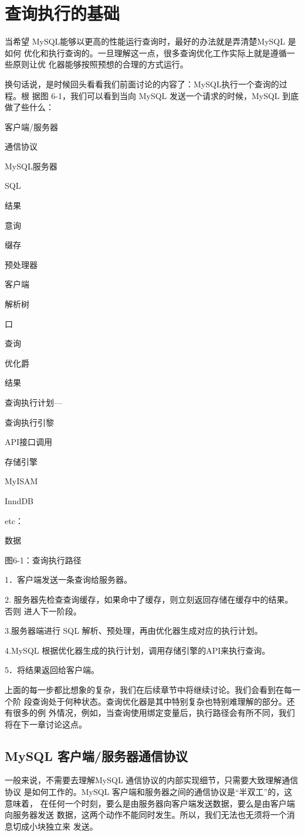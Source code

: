 \section{查询执行的基础}
当希望 MySQL能够以更高的性能运行查询时，最好的办法就是弄清楚MySQL 是如何
优化和执行查询的。一旦理解这一点，很多查询优化工作实际上就是遵循一些原则让优
化器能够按照预想的合理的方式运行。

换句话说，是时候回头看看我们前面讨论的内容了：MySQL执行一个查询的过程。根
据图 6-1，我们可以看到当向 MySQL 发送一个请求的时候，MySQL 到底做了些什么：

客户端/服务器

通信协议

MySQL服务器

SQL

结果

意询

缀存

预处理器

客户端

解析树

口

查询

优化爵

结果

查询执行计划—

查询执行引黎

API接口调用

存储引擎

MyISAM

InndDB

etc：

数据

图6-1：查询执行路径

1．客户端发送一条查询给服务器。

2. 服务器先检查查询缓存，如果命中了缓存，则立刻返回存储在缓存中的结果。否则
进人下一阶段。

3.服务器端进行 SQL 解析、预处理，再由优化器生成对应的执行计划。

4.MySQL 根据优化器生成的执行计划，调用存储引擎的API来执行查询。

5．将结果返回给客户端。

上面的每一步都比想象的复杂，我们在后续章节中将继续讨论。我们会看到在每一个阶
段查询处于何种状态。查询优化器是其中特别复杂也特别难理解的部分。还有很多的例
外情况，例如，当查询使用绑定变量后，执行路径会有所不同，我们将在下一章讨论这点。
\subsection{MySQL 客户端/服务器通信协议}
一般来说，不需要去理解MySQL 通信协议的内部实现细节，只需要大致理解通信协议
是如何工作的。MySQL 客户端和服务器之间的通信协议是“半双工”的，这意味着，
在任何一个时刻，要么是由服务器向客户端发送数据，要么是由客户端向服务器发送
数据，这两个动作不能同时发生。所以，我们无法也无须将一个消息切成小块独立来
发送。

